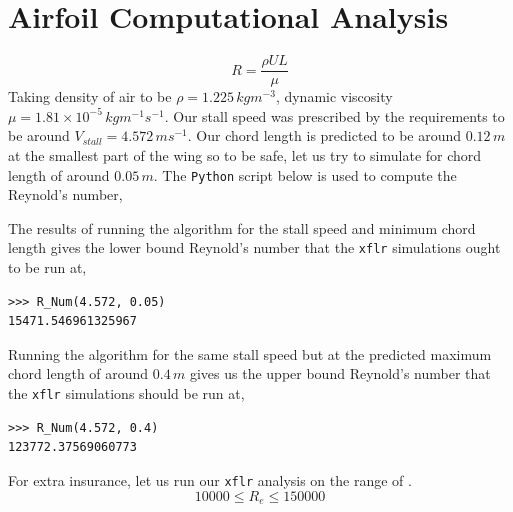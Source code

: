 \section{Airfoil Computational Analysis}

$$R = \frac{\rho U L}{\mu}$$
Taking density of air to be $\rho=1.225\,kgm^{-3}$, dynamic viscosity $\mu=1.81\times10^{-5}\,kgm^{-1}s^{-1}$. 
Our stall speed was prescribed by the requirements to be around $V_{stall} = 4.572\,ms^{-1}$. 
Our chord length is predicted to be around $0.12\,m$ at the smallest part of the wing so to be safe, let us try to simulate for chord length of around $0.05\,m$. The \texttt{Python} script below is used to compute the Reynold's number,

$$$$
The results of running the algorithm for the stall speed and minimum chord length gives the lower bound Reynold's number that the \texttt{xflr} simulations ought to be run at,
\begin{lstlisting}
>>> R_Num(4.572, 0.05)
15471.546961325967
\end{lstlisting}
$$$$
Running the algorithm for the same stall speed but at the predicted maximum chord length of around $0.4\,m$ gives us the upper bound Reynold's number that the \texttt{xflr} simulations should be run at,
\begin{lstlisting}
>>> R_Num(4.572, 0.4)
123772.37569060773
\end{lstlisting}
$$$$
For extra insurance, let us run our \texttt{xflr} analysis on the range of .
\begin{equation}10000 \leq R_{e} \leq 150000 \label{Re req}\end{equation}


